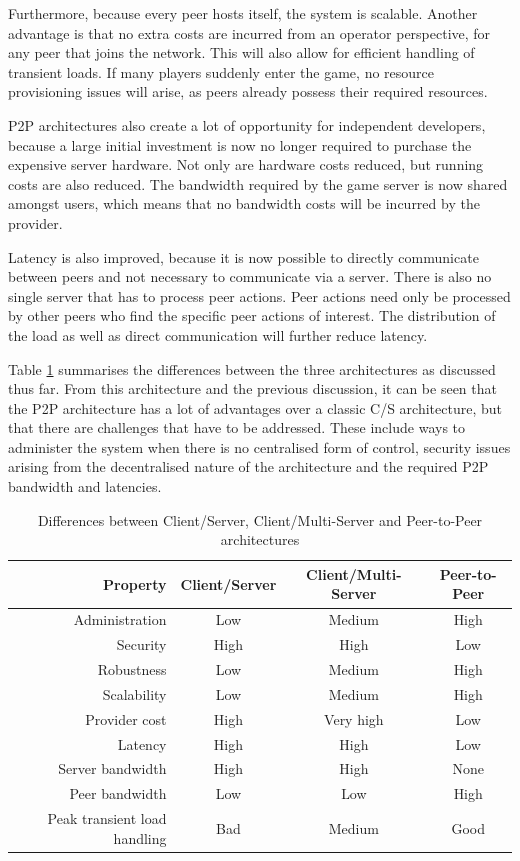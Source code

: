 \documentclass[10pt,a4paper,journal,cspaper,compsoc]{IEEEtran}
\begin{document}
Furthermore, because every peer hosts itself, the system is scalable. Another advantage is that no extra costs are incurred from an operator
perspective, for any peer that joins the network. This will also allow for efficient handling of transient loads. If many players suddenly enter the
game, no resource provisioning issues will arise, as peers already possess their required resources.

\ac{P2P} architectures also create a lot of opportunity for independent developers, because a large initial investment is now no longer required to
purchase the expensive server hardware. Not only are hardware costs reduced, but running costs are also reduced. The bandwidth required by the game
server is now shared amongst users, which means that no bandwidth costs will be incurred by the provider.

Latency is also improved, because it is now possible to directly communicate between peers and not necessary to communicate via a server. There is
also no single server that has to process peer actions. Peer actions need only be processed by other peers who find the specific peer actions of
interest. The distribution of the load as well as direct communication will further reduce latency.

Table \ref{tab_archs} summarises the differences between the three architectures as discussed thus far. From this architecture and the previous
discussion, it can be seen that the P2P architecture has a lot of advantages over a classic C/S architecture, but that there are challenges that have
to be addressed. These include ways to administer the system when there is no centralised form of control, security issues arising from the
decentralised nature of the architecture and the required P2P bandwidth and latencies.
%
\begin{table}[htbp]
\centering
\begin{tabular}{|r|c|c|c|}
\hline
Property & Client/Server & Client/Multi-Server & Peer-to-Peer\\
\hline
Administration & Low & Medium & High\\
Security & High & High & Low\\
Robustness & Low & Medium & High\\
Scalability & Low & Medium & High\\
Provider cost & High & Very high & Low\\
Latency & High & High & Low\\
Server bandwidth & High & High & None\\
Peer bandwidth & Low & Low & High\\
Peak transient load handling & Bad & Medium & Good\\
\hline
\end{tabular}
\caption{Differences between Client/Server, Client/Multi-Server and Peer-to-Peer architectures} \label{tab_archs}
\end{table}
\end{document}
